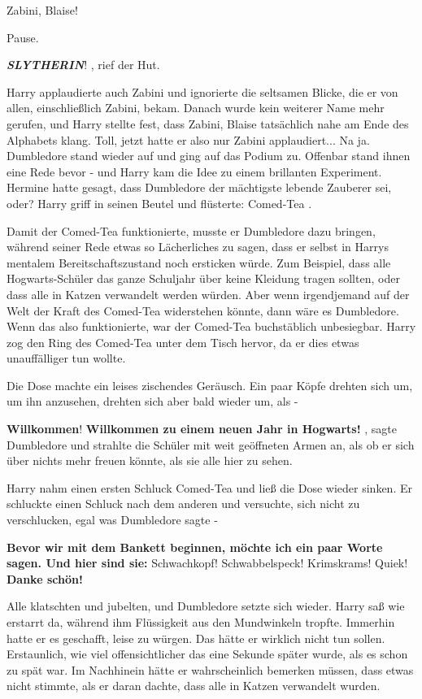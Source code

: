 \glqq Zabini, Blaise!\grqq{}

Pause.

\glqq \textbf{\emph{SLYTHERIN}}!\grqq{} , rief der Hut.

Harry applaudierte auch Zabini und ignorierte die seltsamen Blicke, die er von
allen, einschließlich Zabini, bekam. Danach wurde kein weiterer Name mehr
gerufen, und Harry stellte fest, dass \glqq Zabini, Blaise\grqq{} tatsächlich
nahe am Ende des Alphabets klang. Toll, jetzt hatte er also nur Zabini
applaudiert... Na ja. Dumbledore stand wieder auf und ging auf das Podium zu.
Offenbar stand ihnen eine Rede bevor - und Harry kam die Idee zu einem
brillanten Experiment. Hermine hatte gesagt, dass Dumbledore der mächtigste
lebende Zauberer sei, oder? Harry griff in seinen Beutel und flüsterte: \glqq
Comed-Tea\grqq{} .

Damit der Comed-Tea funktionierte, musste er Dumbledore dazu bringen, während
seiner Rede etwas so Lächerliches zu sagen, dass er selbst in Harrys mentalem
Bereitschaftszustand noch ersticken würde. Zum Beispiel, dass alle
Hogwarts-Schüler das ganze Schuljahr über keine Kleidung tragen sollten, oder
dass alle in Katzen verwandelt werden würden. Aber wenn irgendjemand auf der
Welt der Kraft des Comed-Tea widerstehen könnte, dann wäre es Dumbledore. Wenn
das also funktionierte, war der Comed-Tea buchstäblich unbesiegbar. Harry zog
den Ring des Comed-Tea unter dem Tisch hervor, da er dies etwas unauffälliger
tun wollte.

Die Dose machte ein leises zischendes Geräusch. Ein paar Köpfe drehten sich um,
um ihn anzusehen, drehten sich aber bald wieder um, als -

\glqq \textbf{Willkommen}! \textbf{Willkommen zu einem neuen Jahr in
Hogwarts!}\grqq{} , sagte Dumbledore und strahlte die Schüler mit weit
geöffneten Armen an, als ob er sich über nichts mehr freuen könnte, als sie alle
hier zu sehen.

Harry nahm einen ersten Schluck Comed-Tea und ließ die Dose wieder sinken. Er
schluckte einen Schluck nach dem anderen und versuchte, sich nicht zu
verschlucken, egal was Dumbledore sagte -

\textbf{\glqq Bevor wir mit dem Bankett beginnen, möchte ich ein paar Worte
sagen. Und hier sind sie: }Schwachkopf! Schwabbelspeck! Krimskrams! Quiek!
\textbf{Danke schön!\grqq{} }

Alle klatschten und jubelten, und Dumbledore setzte sich wieder. Harry saß wie
erstarrt da, während ihm Flüssigkeit aus den Mundwinkeln tropfte. Immerhin hatte
er es geschafft, leise zu würgen. Das hätte er wirklich nicht tun sollen.
Erstaunlich, wie viel offensichtlicher das eine Sekunde später wurde, als es
schon zu spät war. Im Nachhinein hätte er wahrscheinlich bemerken müssen, dass
etwas nicht stimmte, als er daran dachte, dass alle in Katzen verwandelt wurden.

